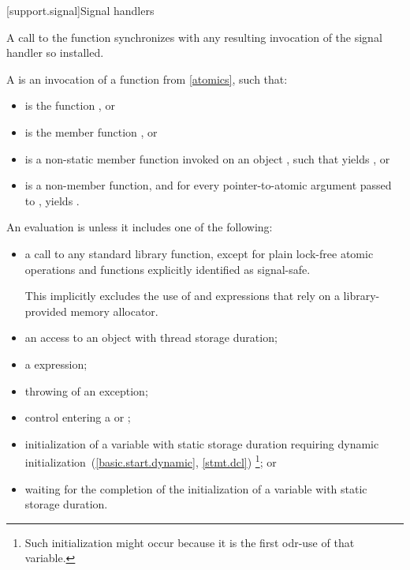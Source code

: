 [support.signal]{Signal handlers}

\pnum
A call to the function  synchronizes with any resulting
invocation of the signal handler so installed.

\pnum
A  is
an invocation of a function  from \ref{atomics},
such that:

\begin{itemize}
\item
{} is the function , or

\item
{} is the member function , or

\item
{} is a non-static member function invoked on an object ,
such that  yields , or

\item
{} is a non-member function, and
for every pointer-to-atomic argument  passed to ,
 yields .
\end{itemize}

\pnum
{}%
An evaluation is  unless it includes one of the following:

\begin{itemize}
\item
a call to any standard library function,
except for plain lock-free atomic operations and
functions explicitly identified as signal-safe.
\begin{note}
This implicitly excludes the use of  and  expressions
that rely on a library-provided memory allocator.
\end{note}

\item
an access to an object with thread storage duration;

\item
a  expression;

\item
throwing of an exception;

\item
control entering a  or ;

\item
initialization of a variable with static storage duration
requiring dynamic initialization~(\ref{basic.start.dynamic}, \ref{stmt.dcl})%
\footnote{Such initialization might occur because it is the first odr-use of that variable.}; or

\item
waiting for the completion of the initialization of a variable with static storage duration.
\end{itemize}

